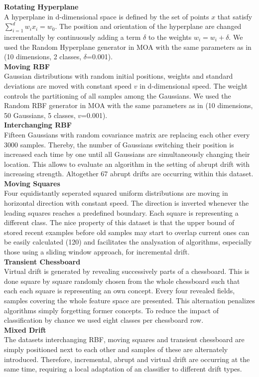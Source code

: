 \documentclass[conference]{IEEEtran}
\begin{document}
\textbf{Rotating Hyperplane}\\
A hyperplane in d-dimensional space is defined by the set of points $x$ that satisfy $\sum_{i=1}^{d}w_ix_i=w_0$. The position and orientation of the hyperplane
are changed incrementally by continuously adding a term $\delta$ to the weights $w_i=w_i+\delta$. 
We used the Random Hyperplane generator in MOA with the same parameters as in \cite{Bifet:2013:EDS:2480362.2480516} (10 dimensions, 2 classes, $\delta$=0.001).\\ 
\textbf{Moving RBF}\\
Gaussian distributions with random initial positions, weights and standard deviations are moved with constant speed $v$ in d-dimensional speed. 
The weight controls the partitioning of all samples among the Gaussians.
We used the Random RBF generator in MOA with the same parameters as in \cite{Bifet:2013:EDS:2480362.2480516} (10 dimensions, 50 Gaussians, 5 classes, $v$=0.001).\\ 
\textbf{Interchanging RBF}\\
Fifteen Gaussians with random covariance matrix are replacing each other every $3000$ samples. Thereby, the number of Gaussians switching their position is increased each time by one
until all Gaussians are simultaneously changing their location. This allows to evaluate an algorithm in the setting of abrupt drift with increasing strength. Altogether 67 abrupt drifts are occurring within this dataset.\\ 
\textbf{Moving Squares}\\
Four equidistantly seperated squared uniform distributions are moving in horizontal direction with constant speed. The direction is inverted whenever the leading squares reaches a predefined boundary.
Each square is representing a different class. 
The nice property of this dataset is that the upper bound of stored recent examples before old samples may start to  overlap current ones can be easily calculated (120) and  
facilitates the analysation of algorithms, especially those using a sliding window approach, for incremental drift.\\
\textbf{Transient Chessboard}\\
Virtual drift is generated by revealing successively parts of a chessboard. This is done square by square randomly chosen from the whole chessboard such that each 
each square is representing an own concept. Every four revealed fields, samples covering the whole feature space are presented. 
This alternation penalizes algorithms simply forgetting former concepts. To reduce the impact of classification by chance we used eight classes per chessboard row.\\ 
\textbf{Mixed Drift} \\
The datasets interchanging RBF, moving squares and transient chessboard are simply positioned next to each other and samples of these are alternately introduced.
Therefore, incremental, abrupt and virtual drift are occurring at the same time, requiring a local adaptation of an classifier to different drift types.\\
\end{document}
